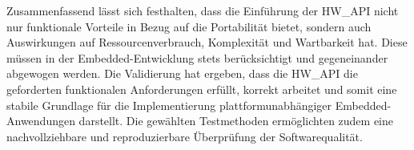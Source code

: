 Zusammenfassend lässt sich festhalten, dass die Einführung der HW\_API nicht nur funktionale Vorteile in Bezug auf die Portabilität bietet, sondern auch Auswirkungen auf Ressourcenverbrauch, Komplexität und Wartbarkeit hat. 
Diese müssen in der Embedded-Entwicklung stets berücksichtigt und gegeneinander abgewogen werden. 
Die Validierung hat ergeben, dass die HW\_API die geforderten funktionalen Anforderungen erfüllt, korrekt arbeitet und somit eine stabile Grundlage für die Implementierung plattformunabhängiger Embedded-Anwendungen darstellt. 
Die gewählten Testmethoden ermöglichten zudem eine nachvollziehbare und reproduzierbare Überprüfung der Softwarequalität.






























